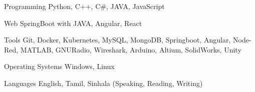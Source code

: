 

\begin{cvskills}

\cvskill
{Programming} %
{Python, C++, C\#, JAVA, JavaScript} %


\cvskill
{Web} %
{SpringBoot with JAVA, Angular, React} %


\cvskill
{Tools} %
{Git, Docker, Kubernetes, MySQL, MongoDB, Springboot, Angular, Node-Red, MATLAB, GNURadio, Wireshark, Arduino, Altium, SolidWorks, Unity} %


\cvskill
{Operating Systems} %
{Windows, Linux} %


\cvskill
{Languages} %
{English, Tamil, Sinhala (Speaking, Reading, Writing)} %

\end{cvskills}
